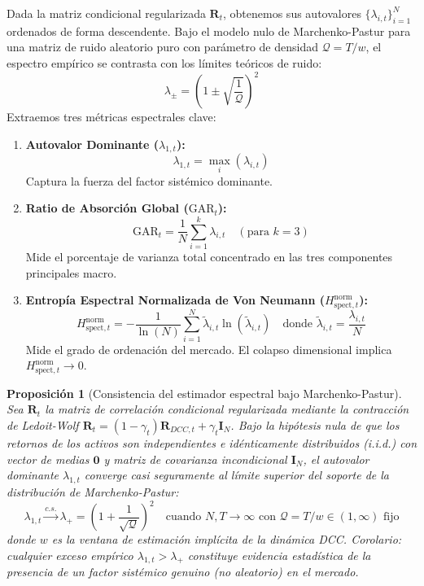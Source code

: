 \documentclass[
  12pt,
]{article}
\providecommand{\tightlist}{%
  \setlength{\itemsep}{0pt}\setlength{\parskip}{0pt}}
\newtheorem{proposition}{Proposición}
\begin{document}
Dada la matriz condicional regularizada \(\mathbf{R}_t\), obtenemos sus
autovalores \(\{\lambda_{i,t}\}_{i=1}^N\) ordenados de forma
descendente. Bajo el modelo nulo de Marchenko-Pastur para una matriz de
ruido aleatorio puro con parámetro de densidad \(\mathcal{Q} = T/w\), el
espectro empírico se contrasta con los límites teóricos de ruido:
\[\lambda_{\pm} = \left( 1 \pm \sqrt{\frac{1}{\mathcal{Q}}} \right)^2\]
Extraemos tres métricas espectrales clave:

\begin{enumerate}
\def\labelenumi{\arabic{enumi}.}
\tightlist
\item
  \textbf{Autovalor Dominante (\(\lambda_{1,t}\)):}
  \[\lambda_{1,t} = \max_i (\lambda_{i,t})\] Captura la fuerza del
  factor sistémico dominante.
\item
  \textbf{Ratio de Absorción Global (\(\text{GAR}_t\)):}
  \[\text{GAR}_t = \frac{1}{N} \sum_{i=1}^k \lambda_{i,t} \quad (\text{para } k = 3)\]
  Mide el porcentaje de varianza total concentrado en las tres
  componentes principales macro.
\item
  \textbf{Entropía Espectral Normalizada de Von Neumann
  (\(H_{\text{spect}, t}^{\text{norm}}\)):}
  \[H_{\text{spect}, t}^{\text{norm}} = -\frac{1}{\ln(N)} \sum_{i=1}^N \tilde{\lambda}_{i,t} \ln(\tilde{\lambda}_{i,t}) \quad \text{donde } \tilde{\lambda}_{i,t} = \frac{\lambda_{i,t}}{N}\]
  Mide el grado de ordenación del mercado. El colapso dimensional
  implica \(H_{\text{spect}, t}^{\text{norm}} \to 0\).
\end{enumerate}

\begin{proposition}[Consistencia del estimador espectral bajo Marchenko-Pastur]
Sea \(\mathbf{R}_t\) la matriz de correlación condicional regularizada mediante la contracción de Ledoit-Wolf \(\mathbf{R}_t = (1-\gamma_t)\mathbf{R}_{DCC, t} + \gamma_t \mathbf{I}_N\). Bajo la hipótesis nula de que los retornos de los activos son independientes e idénticamente distribuidos (i.i.d.) con vector de medias \(\mathbf{0}\) y matriz de covarianza incondicional \(\mathbf{I}_N\), el autovalor dominante \(\lambda_{1,t}\) converge casi seguramente al límite superior del soporte de la distribución de Marchenko-Pastur:
\[\lambda_{1,t} \xrightarrow{c.s.} \lambda_+ = \left(1 + \frac{1}{\sqrt{\mathcal{Q}}}\right)^2 \quad \text{cuando } N, T \to \infty \text{ con } \mathcal{Q} = T/w \in (1, \infty) \text{ fijo}\]
donde \(w\) es la ventana de estimación implícita de la dinámica DCC. Corolario: cualquier exceso empírico \(\lambda_{1,t} > \lambda_+\) constituye evidencia estadística de la presencia de un factor sistémico genuino (no aleatorio) en el mercado.
\end{proposition}
\end{document}
